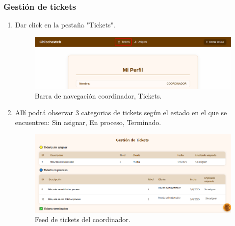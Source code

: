 \subsubsection{Gestión de tickets }
\begin{enumerate}
    \item Dar click en la pestaña "Tickets".
        \begin{figure}[H]
        \centering
        \includegraphics[width=0.8\linewidth]{guiamodulo/navbar-coo-tickect.png}
        \caption{Barra de navegación coordinador, Tickets.}
        \label{fig:navbar-coo-tickect}
        \end{figure}
    \item Allí podrá observar 3 categorias de tickets según el estado en el que se encuentren: Sin asignar, En proceso, Terminado.
        \begin{figure}[H]
            \centering
            \includegraphics[width=0.8\linewidth]{guiamodulo/coordinador-tickets.png}
            \caption{Feed de tickets del coordinador.}
            \label{fig:coordinador-tickets}
        \end{figure}
\end{enumerate}

